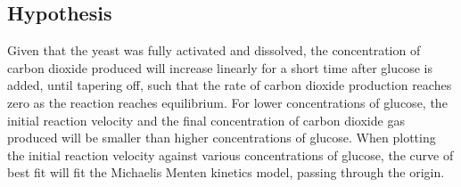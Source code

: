 \documentclass{article}
\begin{document}
\subsection{Hypothesis}
Given that the yeast was fully activated and dissolved, the concentration of carbon dioxide produced will increase linearly for a short time after glucose is added, until tapering off, such that the rate of carbon dioxide production reaches zero as the reaction reaches equilibrium. For lower concentrations of glucose, the initial reaction velocity and the final concentration of carbon dioxide gas produced will be smaller than higher concentrations of glucose. When plotting the initial reaction velocity against various concentrations of glucose, the curve of best fit will fit the Michaelis Menten kinetics model, passing through the origin.

\newpage

\end{document}
